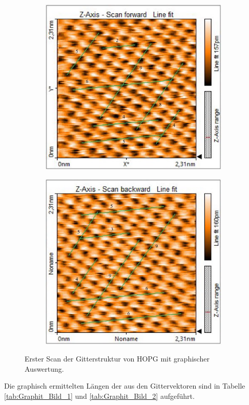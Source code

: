 \begin{figure}[h]
    \centering
    \begin{subfigure}{.475\linewidth}
        \includegraphics[width=\linewidth]{Messdaten/Gitter_Graphit/1_Bild_forward.png}
    \end{subfigure}\hfill 
    \begin{subfigure}{.475\linewidth}
        \includegraphics[width=\linewidth]{Messdaten/Gitter_Graphit/1_Bild_backwards.png}
    \end{subfigure}
    \caption{Erster Scan der Gitterstruktur von HOPG mit graphischer Auswertung.}
    \label{fig:Gitter_Graphit_1}
\end{figure}
Die graphisch ermittelten Längen der aus den Gittervektoren sind in Tabelle \ref{tab:Graphit_Bild_1} und \ref{tab:Graphit_Bild_2} aufgeführt. 

